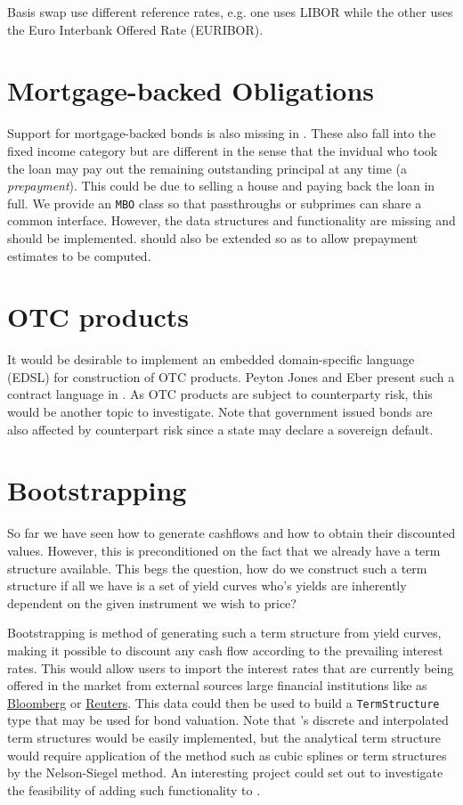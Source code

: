 Basis swap use different reference rates, e.g. one uses LIBOR while the other
uses the Euro Interbank Offered Rate (EURIBOR)\cite{HULL}.

\section{Mortgage-backed Obligations}

Support for mortgage-backed bonds is also missing in \hql. These also fall
into the fixed income category but are different in the sense that the
invidual who took the loan may pay out the remaining outstanding principal
at any time (a \emph{prepayment}). This could be due to selling a house 
and paying back the loan in full. 
We provide an \texttt{MBO} class so that passthroughs or subprimes can share a 
common interface. However, the data structures and functionality are missing 
and should be  implemented. \hql should also be extended so as to allow 
prepayment estimates to be computed.

\section{OTC products}

It would be desirable to implement an embedded domain-specific language (EDSL)
for construction of OTC products. Peyton Jones and Eber present such a contract
language in \cite{composingcontracts}. As OTC products are subject to
counterparty risk, this would be another topic to investigate. Note that government
issued bonds are also affected by counterpart risk since a state may declare
a sovereign default.

\section{Bootstrapping}

So far we have seen how to generate cashflows and how to obtain their 
discounted values. However, this is preconditioned on the fact that we already 
have a term structure available. This begs the question, how do we construct 
such a term structure if all we have is a set of yield curves who's yields 
are inherently dependent on the given instrument we wish to price?

Bootstrapping is method of generating such a term structure from yield 
curves, making it possible to discount any cash flow according to the 
prevailing interest rates. 
This would allow users to import the interest rates that are currently being 
offered in the market from external sources large financial institutions like
as \href{www.bloomberg.com}{Bloomberg} or \href{www.reuters.com}{Reuters}.
This data could then be used to build a \texttt{TermStructure} type 
that may be used for bond valuation. Note that \hql's discrete and interpolated 
term structures would be easily implemented, but the analytical term structure
would require application of the method such as cubic splines or term structures
by the Nelson-Siegel method. 
An interesting project could set out to investigate the feasibility of adding such 
functionality to \hql.

